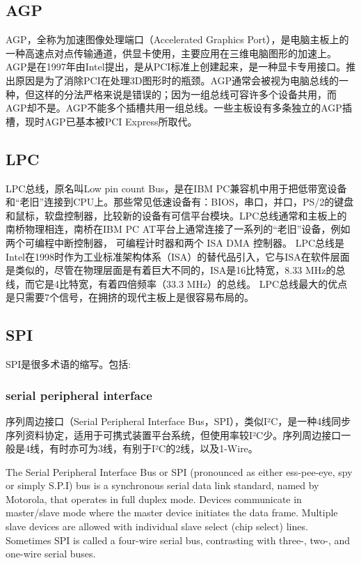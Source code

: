\subsection{AGP}
AGP，全称为加速图像处理端口（Accelerated Graphics Port），是电脑主板上的一种高速点对点传输通道，供显卡使用，主要应用在三维电脑图形的加速上。AGP是在1997年由Intel提出，是从PCI标准上创建起来，是一种显卡专用接口。推出原因是为了消除PCI在处理3D图形时的瓶颈。AGP通常会被视为电脑总线的一种，但这样的分法严格来说是错误的；因为一组总线可容许多个设备共用，而AGP却不是。AGP不能多个插槽共用一组总线。一些主板设有多条独立的AGP插槽，现时AGP已基本被PCI Express所取代。


\subsection{LPC}
LPC总线，原名叫Low pin count Bus，是在IBM PC兼容机中用于把低带宽设备和“老旧”连接到CPU上。那些常见低速设备有：BIOS，串口，并口，PS/2的键盘和鼠标，软盘控制器，比较新的设备有可信平台模块。LPC总线通常和主板上的南桥物理相连，南桥在IBM PC AT平台上通常连接了一系列的“老旧”设备，例如两个可编程中断控制器， 可编程计时器和两个 ISA DMA 控制器。 LPC总线是Intel在1998时作为工业标准架构体系（ISA）的替代品引入，它与ISA在软件层面是类似的，尽管在物理层面是有着巨大不同的，ISA是16比特宽，8.33 MHz的总线，而它是4比特宽，有着四倍频率（33.3 MHz）的总线。 LPC总线最大的优点是只需要7个信号，在拥挤的现代主板上是很容易布局的。


\subsection{SPI}
SPI是很多术语的缩写。包括:
\subsubsection{serial peripheral interface}
序列周边接口（Serial Peripheral Interface Bus，SPI），类似I²C，是一种4线同步序列资料协定，适用于可携式装置平台系统，但使用率较I²C少。序列周边接口一般是4线，有时亦可为3线，有别于I²C的2线，以及1-Wire。

The Serial Peripheral Interface Bus or SPI (pronounced as either ess-pee-eye, spy or simply S.P.I) bus is a synchronous serial data link standard, named by Motorola, that operates in full duplex mode. Devices communicate in master/slave mode where the master device initiates the data frame. Multiple slave devices are allowed with individual slave select (chip select) lines. Sometimes SPI is called a four-wire serial bus, contrasting with three-, two-, and one-wire serial buses.
